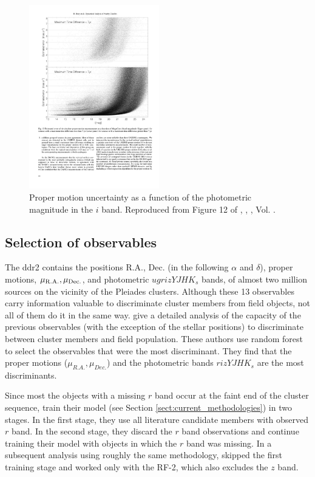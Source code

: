 \begin{figure}[ht!]
\begin{center}
\includegraphics[height=8cm]{background/Figures/F12_Bouy2013.pdf}
\caption{Proper motion uncertainty as a function of the photometric magnitude in the $i$ band. Reproduced from Figure 12 of \citet{Bouy2013}, \textit{}, , Vol. .}
\label{fig:pmuncert}
\end{center}
\end{figure}

\subsection{Selection of observables}
\label{sect:RF-2}
\sloppy
The \gls{ddr2} contains the positions R.A., Dec. (in the following $\alpha$ and $\delta$), proper motions, $\mu_{\rm{R.A.}},\mu_{\rm{Dec.}}$, and photometric $ugrizYJHK_s$ bands, of almost two million sources on the vicinity of the Pleiades clusters. Although these 13 observables carry information valuable to discriminate cluster members from field objects, not all of them do it in the same way. \citet{Sarro2014} give a detailed analysis of the capacity of the previous observables (with the exception of the stellar positions) to discriminate between cluster members and field population. These authors use random forest to select the observables that were the most discriminant. They find that the proper motions ($\mu_{R.A.},\mu_{Dec.}$) and the photometric bands $rizYJHK_s$ are the most discriminants. 

Since most the objects with a missing $r$ band occur at the faint end of the cluster sequence, \citet{Sarro2014} train their model (see Section \ref{sect:current_methodologies}) in two stages. In the first stage, they use all literature candidate members with observed $r$ band. In the second stage, they discard the $r$ band observations and continue training their model with objects in which the $r$ band was missing. In a subsequent analysis using roughly the same methodology, \citet{Bouy2015} skipped the first training stage and worked only with the RF-2, which also excludes the $z$ band.

